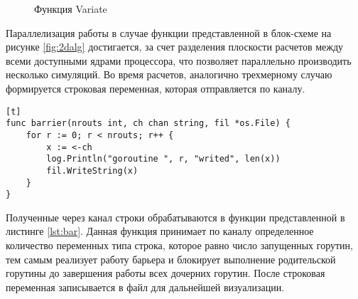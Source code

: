 \begin{figure}[!h]
    \centering
    \scalebox{0.45}{}
    \caption{Функция Variate}
    \label{fig:var2}
\end{figure}

Параллелизация работы в случае функции представленной в блок-схеме на рисунке \ref{fig:2dalg} достигается, за счет разделения плоскости расчетов между всеми доступными ядрами процессора,
что позволяет параллельно производить несколько симуляций. Во время расчетов, аналогично трехмерному случаю формируется строковая переменная, которая отправляется по каналу.

\begin{lstlisting}[label=lst:bar,language=Golang, caption=Функция барьер][t]
func barrier(nrouts int, ch chan string, fil *os.File) {
    for r := 0; r < nrouts; r++ {
        x := <-ch
        log.Println("goroutine ", r, "writed", len(x))
        fil.WriteString(x)
    }
}
\end{lstlisting}

Полученные через канал строки обрабатываются в функции представленной в листинге \ref{lst:bar}. Данная функция принимает по каналу определенное количество переменных типа строка,
которое равно число запущенных горутин, тем самым реализует работу барьера и блокирует выполнение родительской горутины до завершения работы всех дочерних горутин.
После строковая переменная записывается в файл для дальнейшей визуализации.